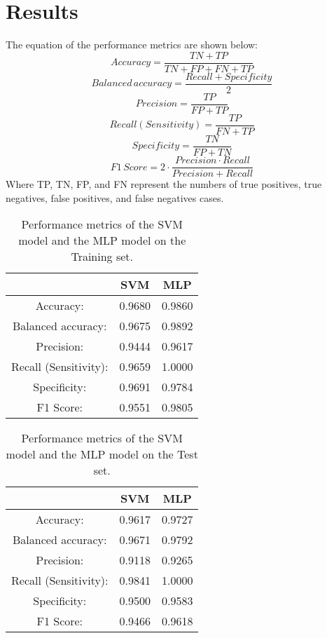 \section{Results}%
The equation of the performance metrics are shown below:
\begin{equation}
Accuracy=\frac{TN+TP}{TN+FP+FN+TP}
\end{equation}
\begin{equation}
Balanced\,accuracy=\frac{Recall+Specificity}{2}
\end{equation}
\begin{equation}
Precision=\frac{TP}{FP+TP}
\end{equation}
\begin{equation}
Recall (Sensitivity)=\frac{TP}{FN+TP}
\end{equation}
\begin{equation}
Specificity=\frac{TN}{FP+TN}
\end{equation}
\begin{equation}
F1\,Score=2\cdot\frac{Precision\cdot Recall}{Precision+Recall}
\end{equation}
Where TP, TN, FP, and FN represent the numbers of true positives, true negatives, false positives, and false negatives cases.

\begin{table}[h]
\centering
\begin{tabular}{|c|c|c|}
\hline
\ & \textbf{SVM} & \textbf{MLP} \\
\hline
Accuracy: &0.9680 &0.9860 \\
Balanced accuracy: &0.9675  &0.9892 \\
Precision: &0.9444  &0.9617 \\ 
Recall (Sensitivity): &0.9659 &1.0000 \\
Specificity: &0.9691 &0.9784  \\
F1 Score: &0.9551 &0.9805 \\
\hline
\end{tabular}
\caption{Performance metrics of the SVM model and the MLP model on the Training set.}
\label{tab:example1}
\end{table}


\begin{table}[h]
\centering
\begin{tabular}{|c|c|c|}
\hline
\ & \textbf{SVM} & \textbf{MLP} \\
\hline
Accuracy: &0.9617 &0.9727\\
Balanced accuracy:  &0.9671 &0.9792\\
Precision:  &0.9118 &0.9265\\ 
Recall (Sensitivity):  &0.9841 &1.0000\\
Specificity:  &0.9500 &0.9583\\
F1 Score:  &0.9466 &0.9618\\
\hline
\end{tabular}
\caption{Performance metrics of the SVM model and the MLP model on the Test set.}
\label{tab:example2}
\end{table}

